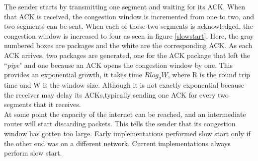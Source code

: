 The sender starts by transmitting one segment and waiting for its ACK. When that ACK is received, the congestion window is incremented from one to two, and two segments can be sent.  When each of those two segments is acknowledged, the congestion window is increased to four as seen in figure \ref{slowstart}. Here, the gray numbered boxes are packages and the white are the corresponding ACK. As each ACK arrives, two packages are generated, one for the ACK package that left the ``\textit{pipe}" and one because an ACK opens the congestion window by one. This provides an exponential growth, it takes time \textbf{$Rlog_2 W$}\cite{Jacobson:1988:CAC:52325.52356}, where R is the round trip time and W is the window size. Although it is not exactly exponential because the receiver may delay its ACKs,typically sending one ACK for every two segments that it receives.\\

At some point the capacity of the internet can be reached, and an intermediate router will start discarding packets.  This tells the sender that its congestion window has gotten too large. Early implementations performed slow start only if the other end was on a different network.  Current implementations always perform slow start.\\
